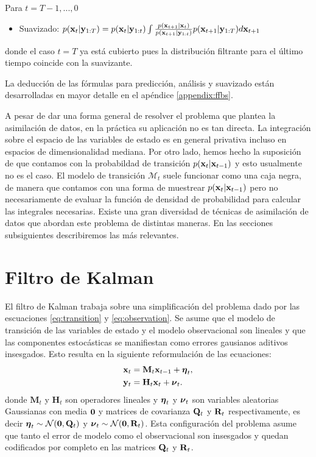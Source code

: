 Para $t = T-1, ..., 0$
\begin{itemize}
    \item Suavizado: $p(\mathbf{x}_t | \mathbf{y}_{1:T}) = p(\mathbf{x}_t |\mathbf{y}_{1:t}) \int \frac{p(\mathbf{x}_{t+1} | \mathbf{x}_t)}
    {p(\mathbf{x}_{t+1} |\mathbf{y}_{1:t})}
    p(\mathbf{x}_{t+1} | \mathbf{y}_{1:T}) d\mathbf{x}_{t+1}$
\end{itemize}
donde el caso $t = T$ ya está cubierto pues la distribución filtrante para el último tiempo coincide con la suavizante.

La deducción de las fórmulas para predicción, análisis y suavizado están desarrolladas en mayor detalle en el apéndice \ref{appendix:ffbs}.

A pesar de dar una forma general de resolver el problema que plantea la asimilación de datos, en la práctica su aplicación no es tan directa. La integración sobre el espacio de las variables de estado es en general privativa incluso en espacios de dimensionalidad mediana. Por otro lado, hemos hecho la suposición de que contamos con la probabildad de transición $p(\mathbf{x}_t | \mathbf{x}_{t-1})$ y esto usualmente no es el caso. El modelo de transición $\mathcal{M}_t$ suele funcionar como una caja negra, de manera que contamos con una forma de muestrear $p(\mathbf{x}_t | \mathbf{x}_{t-1})$ pero no necesariamente de evaluar la función de densidad de probabilidad para calcular las integrales necesarias. Existe una gran diversidad de técnicas de asimilación de datos que abordan este problema de distintas maneras. En las secciones subsiguientes describiremos las más relevantes.

\section{Filtro de Kalman}\label{sec:kf}

El filtro de Kalman trabaja sobre una simplificación del problema dado por las escuaciones \ref{eq:transition} y \ref{eq:observation}. Se asume que el modelo de transición de las variables de estado y el modelo observacional son lineales y que las componentes estocásticas se manifiestan como errores gausianos aditivos insesgados. Esto resulta en la siguiente reformulación de las ecuaciones:
\begin{align}
    \mathbf{x}_t &= \mathbf{M}_t \mathbf{x}_{t-1} + \mbox{\boldmath$ \eta $}_t, \label{eq:kf_forward}\\
    \mathbf{y}_t &= \mathbf{H}_t \mathbf{x}_t + \mbox{\boldmath$ \nu $}_t. \label{eq:kf_observational}
\end{align}
donde $\mathbf{M}_t$ y $\mathbf{H}_t$ son operadores lineales y $\mbox{\boldmath$ \eta $}_t$ y $\mbox{\boldmath$ \nu $}_t$ son variables aleatorias Gaussianas con media $\mathbf{0}$ y matrices de covarianza $\mathbf{Q}_t$ y $\mathbf{R}_t$ respectivamente, es decir $\mbox{\boldmath$ \eta $}_t \sim \mathcal{N}(\mathbf{0}, \mathbf{Q}_t)$ y $\mbox{\boldmath$ \nu $}_t \sim \mathcal{N}(\mathbf{0}, \mathbf{R}_t)$. Esta configuración del problema asume que tanto el error de modelo como el observacional son insesgados y quedan codificados por completo en las matrices $\mathbf{Q}_t$ y $\mathbf{R}_t$.

